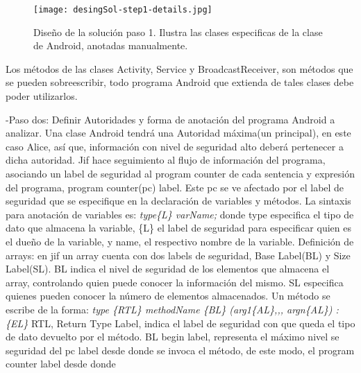 \begin{figure}[h!]
	\begin{center}
	\texttt{[image: desingSol-step1-details.jpg]}
	\end{center}
	\caption{Diseño de la solución paso 1. Ilustra las clases especificas de la
	clase de Android, anotadas manualmente.}
	\label{fig:desingSol-step1}
\end{figure}

Los métodos de las clases Activity, Service y BroadcastReceiver, son métodos
que se pueden sobreescribir, todo programa Android que extienda de tales clases
debe poder utilizarlos.

-Paso dos: 
Definir Autoridades y forma de anotación del programa Android a analizar.
Una clase Android tendrá una Autoridad máxima(un principal), en este caso Alice,
así que, información con nivel de seguridad alto deberá pertenecer a dicha
autoridad.\newline
Jif hace seguimiento al flujo de información del programa, asociando un label
de seguridad al program counter de cada sentencia y expresión del programa,
program counter(pc) label. Este pc se ve afectado por el label
de seguridad que se especifique en la declaración de variables y
métodos.\newline 
La sintaxis para anotación de variables es: \newline 
\emph{ type\{L\} varName; } \newline donde type especifica el tipo de dato que
almacena la variable, \{L\} el label de seguridad  para especificar quien es el
dueño de la variable, y name, el respectivo nombre de la variable.\newline
Definición de arrays:\newline
en jif un array cuenta con dos labels de seguridad, Base Label(BL) y Size
Label(SL). BL indica el nivel de seguridad de los elementos que almacena el
array, controlando quien puede conocer la información del mismo. SL especifica
quienes pueden conocer la número de elementos almacenados.\newline
Un método se escribe de la forma:\newline
\emph{ type \{RTL\} methodName \{BL\} (arg1\{AL\},,, argn\{AL\}) :\{EL\}
}\newline RTL, Return Type Label, indica el label de seguridad con que
queda el tipo de dato devuelto por el método.\newline 
BL begin label, representa el máximo nivel se seguridad del pc label desde donde
se invoca el método, de este modo, el program counter label desde donde
